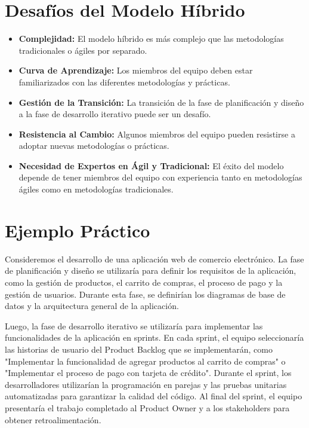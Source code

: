 \documentclass{article}
\begin{document}
\section{Desafíos del Modelo Híbrido}

\begin{itemize}
    \item \textbf{Complejidad:} El modelo híbrido es más complejo que las metodologías tradicionales o ágiles por separado.
    \item \textbf{Curva de Aprendizaje:} Los miembros del equipo deben estar familiarizados con las diferentes metodologías y prácticas.
    \item \textbf{Gestión de la Transición:} La transición de la fase de planificación y diseño a la fase de desarrollo iterativo puede ser un desafío.
    \item \textbf{Resistencia al Cambio:} Algunos miembros del equipo pueden resistirse a adoptar nuevas metodologías o prácticas.
    \item \textbf{Necesidad de Expertos en Ágil y Tradicional:}  El éxito del modelo depende de tener miembros del equipo con experiencia tanto en metodologías ágiles como en metodologías tradicionales.
\end{itemize}

\section{Ejemplo Práctico}

Consideremos el desarrollo de una aplicación web de comercio electrónico. La fase de planificación y diseño se utilizaría para definir los requisitos de la aplicación, como la gestión de productos, el carrito de compras, el proceso de pago y la gestión de usuarios.  Durante esta fase, se definirían los diagramas de base de datos y la arquitectura general de la aplicación.

Luego, la fase de desarrollo iterativo se utilizaría para implementar las funcionalidades de la aplicación en sprints.  En cada sprint, el equipo seleccionaría las historias de usuario del Product Backlog que se implementarán, como "Implementar la funcionalidad de agregar productos al carrito de compras" o "Implementar el proceso de pago con tarjeta de crédito". Durante el sprint, los desarrolladores utilizarían la programación en parejas y las pruebas unitarias automatizadas para garantizar la calidad del código. Al final del sprint, el equipo presentaría el trabajo completado al Product Owner y a los stakeholders para obtener retroalimentación.
\end{document}
